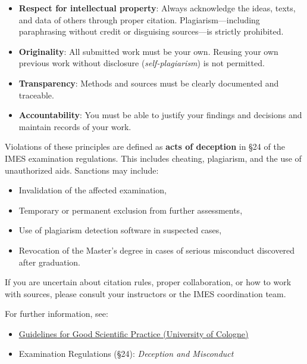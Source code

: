\documentclass[
  letterpaper,
  10pt,
  openany]{book}
\providecommand{\tightlist}{%
  \setlength{\itemsep}{0pt}\setlength{\parskip}{0pt}}\usepackage{longtable,booktabs,array}
\begin{document}
\begin{itemize}
\tightlist
\item
  \textbf{Respect for intellectual property}: Always acknowledge the
  ideas, texts, and data of others through proper citation.
  Plagiarism---including paraphrasing without credit or disguising
  sources---is strictly prohibited.
\item
  \textbf{Originality}: All submitted work must be your own. Reusing
  your own previous work without disclosure (\emph{self-plagiarism}) is
  not permitted.
\item
  \textbf{Transparency}: Methods and sources must be clearly documented
  and traceable.
\item
  \textbf{Accountability}: You must be able to justify your findings and
  decisions and maintain records of your work.
\end{itemize}

Violations of these principles are defined as \textbf{acts of deception}
in §24 of the IMES examination regulations. This includes cheating,
plagiarism, and the use of unauthorized aids. Sanctions may include:

\begin{itemize}
\tightlist
\item
  Invalidation of the affected examination,
\item
  Temporary or permanent exclusion from further assessments,
\item
  Use of plagiarism detection software in suspected cases,
\item
  Revocation of the Master's degree in cases of serious misconduct
  discovered after graduation.
\end{itemize}

If you are uncertain about citation rules, proper collaboration, or how
to work with sources, please consult your instructors or the IMES
coordination team.

For further information, see:

\begin{itemize}
\tightlist
\item
  \href{https://portal.uni-koeln.de/en/research/scientific-principles/safeguarding-good-scientific-practice}{Guidelines
  for Good Scientific Practice (University of Cologne)}\\
\item
  Examination Regulations (§24): \emph{Deception and Misconduct}
\end{itemize}
\end{document}
